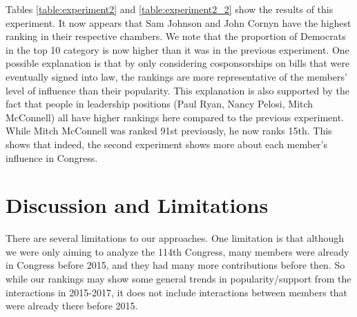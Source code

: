 \documentclass[11pt]{article}
\begin{document}
Tables \ref{table:experiment2} and \ref{table:experiment2_2} show the results of this experiment. It now appears that Sam Johnson and John Cornyn have the highest ranking in their respective chambers. We note that the proportion of Democrats in the top 10 category is now higher than it was in the previous experiment. One possible explanation is that by only considering cosponsorships on bills that were eventually signed into law, the rankings are more representative of the members' level of influence than their popularity. This explanation is also supported by the fact that people in leadership positions (Paul Ryan, Nancy Pelosi, Mitch McConnell) all have higher rankings here compared to the previous experiment. While Mitch McConnell was ranked 91st previously, he now ranks 15th. This shows that indeed, the second experiment shows more about each member's influence in Congress. 
 
 
 
 
 
 
 
 
 
 
 
 
 
 
 

\pagebreak















\section*{Discussion and Limitations}
There are several limitations to our approaches. One limitation is that although we were only aiming to analyze the 114th Congress, many members were already in Congress before 2015, and they had many more contributions before then. So while our rankings may show some general trends in popularity/support from the interactions in 2015-2017, it does not include interactions between members that were already there before 2015. 
\end{document}
